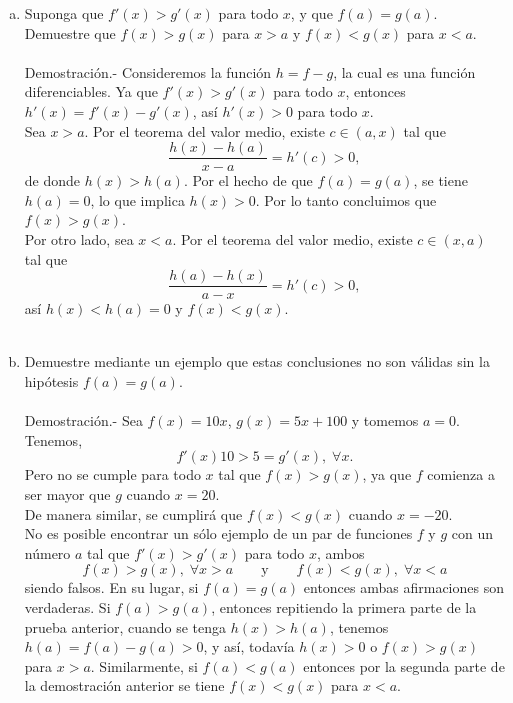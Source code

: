 \begin{enumerate}[\bfseries 1.]
\begin{enumerate}[(a)]
	    \item Suponga que $f'(x)>g'(x)$ para todo $x$, y que $f(a)=g(a)$. Demuestre que $f(x)>g(x)$ para $x>a$ y $f(x)<g(x)$ para $x<a$.\\\\
		Demostración.-\; Consideremos la función $h=f-g$, la cual es una función diferenciables. Ya que $f'(x)>g'(x)$ para todo $x$, entonces $h'(x)=f'(x)-g'(x)$, así  $h'(x)>0$ para todo $x$.\\
		Sea $x>a$. Por el teorema del valor medio, existe $c\in(a,x)$ tal que
		$$\dfrac{h(x)-h(a)}{x-a}=h'(c)>0,$$
		de donde $h(x)>h(a)$. Por el hecho de que $f(a)=g(a)$, se tiene $h(a)=0$, lo que implica $h(x)>0$. Por lo tanto concluimos que $f(x)>g(x)$.\\
		Por otro lado, sea $x<a$. Por el teorema del valor medio, existe $c\in(x,a)$ tal que
		$$\dfrac{h(a)-h(x)}{a-x}=h'(c)>0,$$
		así $h(x)<h(a)=0$ y $f(x)<g(x)$.\\\\


	    \item Demuestre mediante un ejemplo que estas conclusiones no son válidas sin la hipótesis $f(a)=g(a)$.\\\\
		Demostración.-\; Sea $f(x)=10x$, $g(x)=5x+100$ y tomemos $a=0$. Tenemos,
		$$f'(x)10>5=g'(x),\; \forall x.$$
		Pero no se cumple para todo $x$ tal que $f(x)>g(x)$, ya que $f$ comienza a ser mayor que $g$ cuando $x=20$.\\
		De manera similar, se cumplirá que $f(x)<g(x)$ cuando $x=-20$.\\
		No es posible encontrar un sólo ejemplo de un par de funciones $f$ y $g$ con un número $a$ tal que $f'(x)>g'(x)$ para todo $x$, ambos
		$$f(x)>g(x),\;\forall x>a\qquad \mbox{y}\qquad f(x)<g(x),\; \forall x<a$$
		siendo falsos. En su lugar, si $f(a)=g(a)$ entonces ambas afirmaciones son verdaderas. Si $f(a)>g(a)$, entonces repitiendo la primera parte de la prueba anterior, cuando se tenga $h(x)>h(a)$, tenemos $h(a)=f(a)-g(a)>0$, y así, todavía $h(x)>0$ o $f(x)>g(x)$ para $x>a$. Similarmente, si $f(a)<g(a)$ entonces por la segunda parte de la demostración anterior se tiene $f(x)<g(x)$ para $x<a.$\\\\


\end{enumerate}
\end{enumerate}
